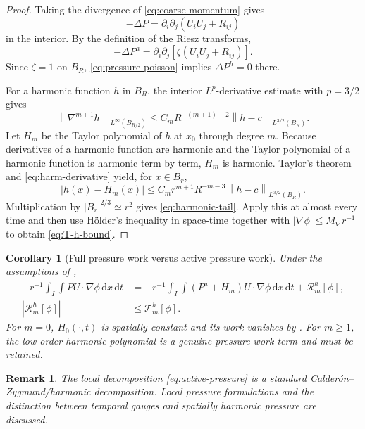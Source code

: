\documentclass[11pt]{article}
\numberwithin{equation}{section}
\newtheorem{corollary}[theorem]{Corollary}
\newtheorem{remark}[theorem]{Remark}
\newcommand{\dxdt}{\,\mathrm dx\,\mathrm dt}
\newcommand{\norm}[2]{\left\lVert #1\right\rVert_{#2}}
\begin{document}
\begin{proof}
Taking the divergence of \eqref{eq:coarse-momentum} gives
\begin{equation}\label{eq:pressure-poisson}
-\Delta P
=
\partial_i\partial_j(U_iU_j+R_{ij})
\end{equation}
in the interior. By the definition of the Riesz transforms,
\[
-\Delta P^a
=
\partial_i\partial_j
\left[
\zeta(U_iU_j+R_{ij})
\right].
\]
Since \(\zeta=1\) on \(B_R\), \eqref{eq:pressure-poisson} implies \(\Delta P^h=0\) there.

For a harmonic function \(h\) in \(B_R\), the interior \(L^p\)-derivative estimate with \(p=3/2\) gives
\begin{equation}\label{eq:harm-derivative}
\norm{\nabla^{m+1}h}{L^\infty(B_{R/2})}
\le
C_m R^{-(m+1)-2}
\norm{h-c}{L^{3/2}(B_R)}.
\end{equation}
Let \(H_m\) be the Taylor polynomial of \(h\) at \(x_0\) through degree \(m\). Because derivatives of a harmonic function are harmonic and the Taylor polynomial of a harmonic function is harmonic term by term, \(H_m\) is harmonic. Taylor's theorem and \eqref{eq:harm-derivative} yield, for \(x\in B_r\),
\[
|h(x)-H_m(x)|
\le
C_m r^{m+1}R^{-m-3}
\norm{h-c}{L^{3/2}(B_R)}.
\]
Multiplication by \(|B_r|^{2/3}\simeq r^2\) gives \eqref{eq:harmonic-tail}. Apply this at almost every time and then use H\"older's inequality in space-time together with \(|\nabla\phi|\le M_\nabla r^{-1}\) to obtain \eqref{eq:T-h-bound}.
\end{proof}

\begin{corollary}[Full pressure work versus active pressure work]\label{cor:pressure-split}
Under the assumptions of ,
\begin{align}
-r^{-1}\int_I\int PU\cdot\nabla\phi\dxdt
&=
-r^{-1}\int_I\int(P^a+H_m)U\cdot\nabla\phi\dxdt
+
\mathcal R_m^h[\phi],
\label{eq:pressure-work-split}
\\
|\mathcal R_m^h[\phi]|
&\le\mathcal T_m^h[\phi].
\label{eq:pressure-work-residual}
\end{align}
For \(m=0\), \(H_0(\cdot,t)\) is spatially constant and its work vanishes by . For \(m\ge1\), the low-order harmonic polynomial is a genuine pressure-work term and must be retained.
\end{corollary}

\begin{remark}
The local decomposition \eqref{eq:active-pressure} is a standard Calder\'on--Zygmund/harmonic decomposition. Local pressure formulations and the distinction between temporal gauges and spatially harmonic pressure are discussed.
\end{remark}
\end{document}
